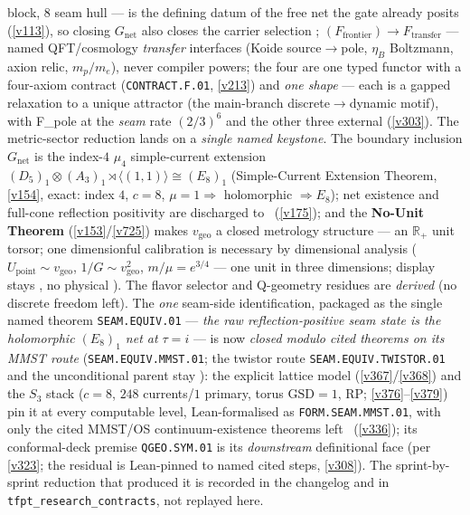 block, $8$ seam hull --- is the defining datum of the free net the gate already posits (\vref{v113}), so
closing $G_{\mathrm{net}}$ also closes the carrier selection \mE; $(F_{\mathrm{frontier}})\to F_{\mathrm{transfer}}$
--- named QFT/cosmology \emph{transfer} interfaces (Koide source$\to$pole, $\eta_B$ Boltzmann, axion relic,
$m_p/m_e$), never compiler powers; the four are one typed functor with a four-axiom contract
(\texttt{CONTRACT.F.01}, \vref{v213}) and \emph{one shape} --- each is a gapped relaxation to a unique attractor
(the main-branch discrete$\to$dynamic motif), with F\_pole at the \emph{seam} rate $(2/3)^6$ and the other three
external (\vref{v303}). The metric-sector reduction lands on a \emph{single named keystone}. The boundary inclusion
$G_{\mathrm{net}}$ is the index-$4$ $\mu_4$ simple-current extension
$(D_5)_1{\otimes}(A_3)_1{\rtimes}\langle(1,1)\rangle\cong(E_8)_1$ (Simple-Current Extension Theorem,
\vref{v154}, exact: index $4$, $c{=}8$, $\mu{=}1\Rightarrow$ holomorphic $\Rightarrow E_8$); net
existence and full-cone reflection positivity are discharged to \mE\ (\vref{v175}); and the
\textbf{No-Unit Theorem} (\vref{v153}/\vref{v725}) makes $v_{\mathrm{geo}}$ a
closed metrology structure --- an $\mathbb{R}_+$ unit torsor; one dimensionful
calibration is necessary by dimensional analysis
($U_{\mathrm{point}}\sim v_{\mathrm{geo}}$, $1/G\sim v_{\mathrm{geo}}^2$, $m/\mu=e^{3/4}$ --- one unit in
three dimensions; display stays \mO, no physical \mE). The flavor selector and Q-geometry residues are \emph{derived} (no discrete freedom
left). The \emph{one} seam-side identification, packaged as the single named
theorem \texttt{SEAM.EQUIV.01} --- \emph{the raw reflection-positive seam state is the holomorphic
$(E_8)_1$ net at $\tau{=}i$} --- is now \emph{closed modulo cited theorems on its MMST route}
(\texttt{SEAM.EQUIV.MMST.01}; the twistor route \texttt{SEAM.EQUIV.TWISTOR.01} and the unconditional parent stay
\mO): the explicit lattice model
(\vref{v367}/\vref{v368}) and the $S_3$ stack ($c{=}8$, $248$ currents/$1$ primary, torus $\mathrm{GSD}{=}1$, RP;
\vref{v376}--\vref{v379}) pin it at every computable level, Lean-formalised as \texttt{FORM.SEAM.MMST.01}, with only
the cited MMST/OS continuum-existence theorems left \mO\ (\vref{v336}); its conformal-deck premise
\texttt{QGEO.SYM.01} is its \emph{downstream} definitional face (per \vref{v323}; the residual is Lean-pinned to named
cited steps, \vref{v308}). The
sprint-by-sprint reduction that produced it is recorded in the changelog and in
\texttt{tfpt\_research\_contracts}, not replayed here.
